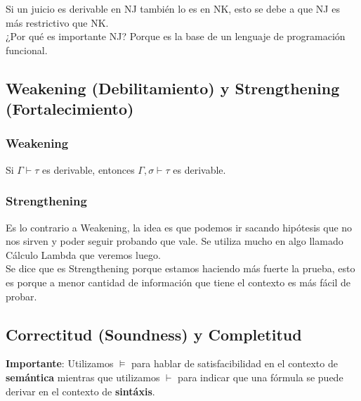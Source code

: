 \documentclass[10pt,a4paper]{article}
\begin{document}
Si un juicio es derivable en NJ también lo es en NK, esto se debe a que NJ es más restrictivo que NK. \\
¿Por qué es importante NJ? Porque es la base de un lenguaje de programación funcional.
\subsection*{Weakening (Debilitamiento) y Strengthening (Fortalecimiento)}
\subsubsection*{Weakening}
Si $\Gamma \vdash \tau$ es derivable, entonces $\Gamma, \sigma \vdash \tau$ es derivable. 
\subsubsection*{Strengthening}
Es lo contrario a Weakening, la idea es que podemos ir sacando hipótesis que no nos sirven y poder seguir probando que vale. Se utiliza mucho en algo llamado Cálculo Lambda que veremos luego. \\
Se dice que es Strengthening porque estamos haciendo más fuerte la prueba, esto es porque a menor cantidad de información que tiene el contexto es más fácil de probar.
\subsection*{Correctitud (Soundness) y Completitud}
\textbf{Importante}: Utilizamos $\vDash$ para hablar de satisfacibilidad en el contexto de \textbf{semántica} mientras que utilizamos $\vdash$ para indicar que una fórmula se puede derivar en el contexto de \textbf{sintáxis}. \\
\end{document}
